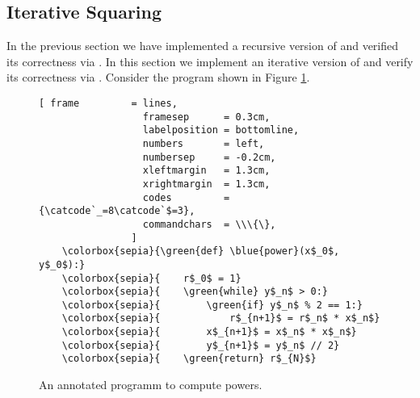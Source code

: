 \subsection{Iterative Squaring}
In the previous section we have implemented a recursive version of  and verified its
correctness via .  In this section we implement an iterative version of
 and verify its correctness via .
Consider the program shown in Figure \ref{fig:power-iterative-annotated.stlx}. 

\begin{figure}[!h]
\centering
\begin{Verbatim}[ frame         = lines, 
                  framesep      = 0.3cm, 
                  labelposition = bottomline,
                  numbers       = left,
                  numbersep     = -0.2cm,
                  xleftmargin   = 1.3cm,
                  xrightmargin  = 1.3cm,
                  codes         = {\catcode`_=8\catcode`$=3},
                  commandchars  = \\\{\},
                ]
    \colorbox{sepia}{\green{def} \blue{power}(x$_0$, y$_0$):}
    \colorbox{sepia}{    r$_0$ = 1}
    \colorbox{sepia}{    \green{while} y$_n$ > 0:}
    \colorbox{sepia}{        \green{if} y$_n$ % 2 == 1:}
    \colorbox{sepia}{            r$_{n+1}$ = r$_n$ * x$_n$}
    \colorbox{sepia}{        x$_{n+1}$ = x$_n$ * x$_n$}
    \colorbox{sepia}{        y$_{n+1}$ = y$_n$ // 2}
    \colorbox{sepia}{    \green{return} r$_{N}$}
\end{Verbatim}
\vspace*{-0.3cm}
\caption{An annotated programm to compute powers.}
\label{fig:power-iterative-annotated.stlx}
\end{figure} %

